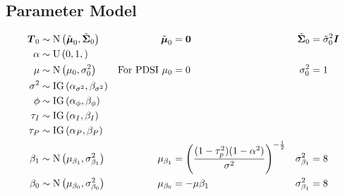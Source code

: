 \documentclass{article}\usepackage[]{graphicx}\usepackage[]{color}
\def\bm#1{\mbox{\boldmath $#1$}}
\begin{document}
\subsection{Parameter Model}
%
\begin{align}
%
\bm{T}_0 & \sim \mbox{N}\left( \tilde{\bm{\mu}}_0, \tilde{\bm{\Sigma}}_0 \right) & \tilde{\bm{\mu}}_0 & = \bm{0} & \tilde{\bm{\Sigma}}_0 & = \tilde{\sigma}^2_0 \bm{I}\\
%
\alpha & \sim \mbox{U}\left( 0, 1, \right)\\
%
\mu & \sim \mbox{N} \left( \mu_0, \sigma^2_0 \right) & \mbox{For PDSI } \mu_0 & = 0 & \sigma^2_0 & = 1 \\
%
\sigma^2 & \sim \mbox{IG}\left( \alpha_{\sigma^2}, \beta_{\sigma^2} \right)\\
%
\phi & \sim \mbox{IG}\left( \alpha_\phi, \beta_\phi \right)\\
%
\tau_I & \sim \mbox{IG}\left( \alpha_I, \beta_I \right)\\
%
\tau_P & \sim \mbox{IG}\left( \alpha_P, \beta_P \right)\\
%
\beta_1 & \sim \mbox{N} \left( \mu_{\beta_1}, \sigma^2_{\beta_1} \right) & \mu_{\beta_1} & = \left( \frac{(1 - \tau_p^2) (1 - \alpha^2)} {\sigma^2} \right)^{ - \frac{1} {2} } & \sigma^2_{\beta_1} & = 8 \\
%
\beta_0 & \sim \mbox{N} \left( \mu_{\beta_0}, \sigma^2_{\beta_0} \right) & \mu_{\beta_0} & = - \mu \beta_1 & \sigma^2_{\beta_1} & = 8 \\
%
\end{align}
%
\end{document}
